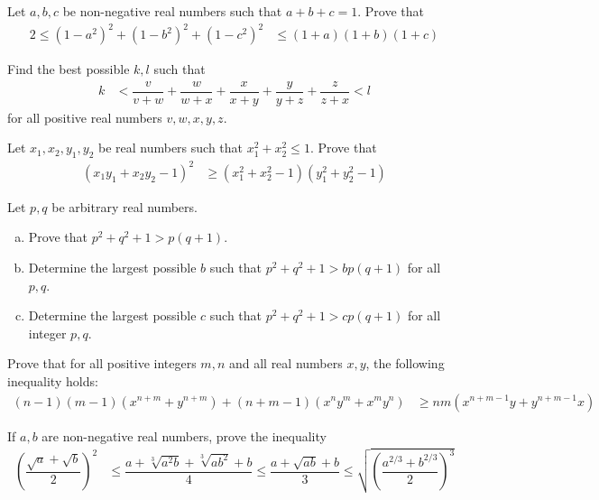 \documentclass{subfile}
\begin{document}
		\begin{problem}
			Let $a,b,c$ be non-negative real numbers such that $a+b+c=1$. Prove that
				\begin{align*}
					2\leq(1-a^{2})^{2}+(1-b^{2})^{2}+(1-c^{2})^{2}
						& \leq (1+a)(1+b)(1+c)
				\end{align*}
		\end{problem}
		
		\begin{problem}
			Find the best possible $k,l$ such that
				\begin{align*}
					k
						& <\dfrac{v}{v+w}+\dfrac{w}{w+x}+\dfrac{x}{x+y}+\dfrac{y}{y+z}+\dfrac{z}{z+x}<l
				\end{align*}
			for all positive real numbers $v,w,x,y,z$.
		\end{problem}
		
		\begin{problem}
			Let $x_{1},x_{2},y_{1},y_{2}$ be real numbers such that $x_{1}^{2}+x_{2}^{2}\leq1$. Prove that
				\begin{align*}
					(x_{1}y_{1}+x_{2}y_{2}-1)^{2}
						& \geq(x_{1}^{2}+x_{2}^{2}-1)(y_{1}^{2}+y_{2}^{2}-1)
				\end{align*}
		\end{problem}
		
		\begin{problem}
			Let $p,q$ be arbitrary real numbers.
				\begin{enumerate}[(a)]
					\item Prove that $p^2+q^2+1>p(q+1)$.
					\item Determine the largest possible $b$ such that $p^{2}+q^{2}+1>bp(q+1)$ for all $p,q$.
					\item Determine the largest possible $c$ such that $p^{2}+q^{2}+1>cp(q+1)$ for all integer $p,q$.
				\end{enumerate}
		\end{problem}
		
		\begin{problem}
			Prove that for all positive integers $m,n$ and all real numbers $x,y$, the following inequality holds:
				\begin{align*}
					(n-1)(m-1)\left(x^{n+m}+y^{n+m}\right)+(n+m-1)\left(x^{n}y^{m}+x^{m}y^{n}\right)
						& \geq nm\left(x^{n+m-1}y+y^{n+m-1}x\right)
				\end{align*}
		\end{problem}
		
		\begin{problem}
			If $a,b$ are non-negative real numbers, prove the inequality
				\begin{align*}
					\left(\dfrac{\sqrt{a}+\sqrt{b}}{2}\right)^{2}
						& \leq \dfrac{a+\sqrt[3]{a^{2}b}+\sqrt[3]{ab^{2}}+b}{4}\leq\dfrac{a+\sqrt{ab}+b}{3}\leq\sqrt{\left(\dfrac{a^{2/3}+b^{2/3}}{2}\right)^{3}}
				\end{align*}
		\end{problem}
\end{document}
